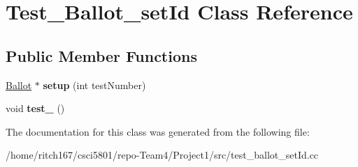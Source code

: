 \hypertarget{classTest__Ballot__setId}{}\section{Test\+\_\+\+Ballot\+\_\+set\+Id Class Reference}
\label{classTest__Ballot__setId}
\subsection*{Public Member Functions}
\begin{DoxyCompactItemize}
\item 
\mbox{\label{classTest__Ballot__setId_af5c691b6ef38ade8ff313e7b00a533ff}} 
\hyperlink{classBallot}{Ballot} $\ast$ {\bfseries setup} (int test\+Number)
\item 
\mbox{\label{classTest__Ballot__setId_aed93c97f36445d428361ab61c9f64e42}} 
void {\bfseries test\+\_} ()
\end{DoxyCompactItemize}


The documentation for this class was generated from the following file\+:\begin{DoxyCompactItemize}
\item 
/home/ritch167/csci5801/repo-\/\+Team4/\+Project1/src/test\+\_\+ballot\+\_\+set\+Id.\+cc\end{DoxyCompactItemize}
